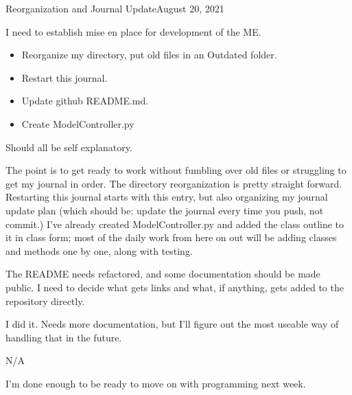 \usepackage{hyperref}%
\begin{entry}{Reorganization and Journal Update}{August 20, 2021}
    \objective 
    
    I need to establish mise en place for development of the ME.
    \outline
    
    \begin{itemize}
        \item Reorganize my directory, put old files in an Outdated folder.
        \item Restart this journal.
        \item Update github README.md.
        \item Create ModelController.py
    \end{itemize}
    
    \procedures
    
    Should all be self explanatory.

    \parameters
    
    The point is to get ready to work without fumbling over old files or struggling to get my journal in order. The
    directory reorganization is pretty straight forward. Restarting this journal starts with this entry, but also
    organizing my journal update plan (which should be: update the journal every time you push, not commit.) I've
    already created ModelController.py and added the class outline to it in class form; most of the daily work from here
    on out will be adding classes and methods one by one, along with testing.

    The README needs refactored, and some documentation should be made public. I need to decide what gets links and
    what, if anything, gets added to the repository directly.
    
    \observations
    
    I did it.
    Needs more documentation, but I'll figure out the most useable way of handling that in the future.
    
    \data
    
    N/A

    \results
    
    I'm done enough to be ready to move on with programming next week.
    
\end{entry}


